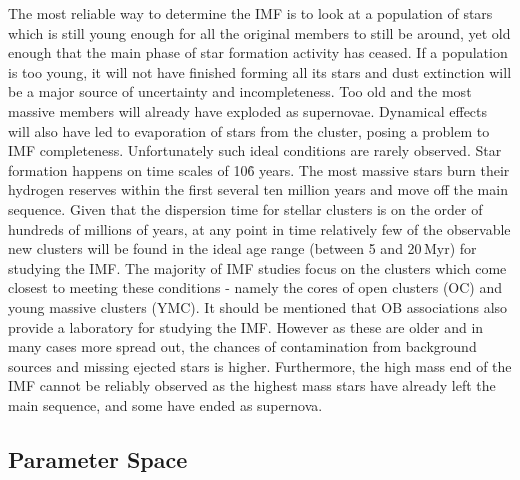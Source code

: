The most reliable way to determine the IMF is to look at a population of stars which is still young enough for all the original members to still be around, yet old enough that the main phase of star formation activity has ceased. 
If a population is too young, it will not have finished forming all its stars and dust extinction will be a major source of uncertainty and incompleteness. Too old and the most massive members will already have exploded as supernovae. 
Dynamical effects will also have led to evaporation of stars from the cluster, posing a problem to IMF completeness.
Unfortunately such ideal conditions are rarely observed. 
Star formation happens on time scales of 10\h6 years. 
The most massive stars burn their hydrogen reserves within the first several ten million years and move off the main sequence\needcite. 
Given that the dispersion time for stellar clusters is on the order of hundreds of millions of years, at any point in time relatively few of the observable new clusters will be found in the ideal age range (between 5 and 20\,Myr) for studying the IMF\needcite. 
The majority of IMF studies focus on the clusters which come closest to meeting these conditions - namely the cores of open clusters (OC) and young massive clusters (YMC)\needcite. 
It should be mentioned that OB associations also provide a laboratory for studying the IMF. 
However as these are older and in many cases more spread out, the chances of contamination from background sources and missing ejected stars is higher\needcite\correct. 
Furthermore, the high mass end of the IMF cannot be reliably observed as the highest mass stars have already left the main sequence, and some have ended as supernova\correct.


\subsection{Parameter Space}

